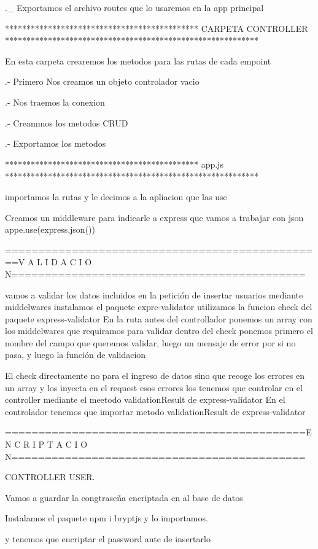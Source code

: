 ._ Exportamos el archivo routes que lo usaremos en la app principal

********************************************* CARPETA CONTROLLER ***********************************************************

En esta carpeta crearemos los metodos para las rutas de cada empoint

.- Primero Nos creamos un objeto controlador vacio

.- Nos traemos la conexion

.- Creammos los metodos CRUD

.- Exportamos los metodos


********************************************* app.js ***********************************************************

importamos la rutas y le decimos a la apliacion que las use

Creamos un middleware para indicarle a express que vamos a trabajar con json
         appe.use(express.json())


================================================V A L I D A C I O N============================================

vamos a validar los datos incluidos en la petición de insertar usuarios mediante middelwares
instalamos el paquete expre-validator 
utilizamos la funcion check del paquete express-validator
 En la ruta antes del controllador ponemos un array con los middelwares que requiramos para validar
dentro del check ponemos primero el nombre del campo que queremos validar, luego un mensaje de error por si no pasa, 
y luego la función de validacion
         
El check directamente no para el ingreso de datos sino que recoge los errores  en un array y los inyecta en el request
esos errores los tenemos que controlar en el controller mediante el meetodo validationResult de express-validator
En el controlador tenemos que importar metodo validationResult de express-validator     





=============================================E N C R I P T A C I O N============================================

CONTROLLER USER. 

Vamos a guardar la congtraseña encriptada en al base de datos

 Instalamos el paquete npm i bryptjs y lo importamos.

y tenemos que encriptar el password ante de insertarlo

